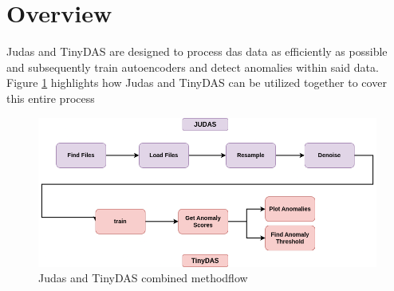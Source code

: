 \section{Overview}

Judas and TinyDAS are designed to process \acrshort{das} data as efficiently as possible and subsequently train autoencoders and detect anomalies within said data. Figure \ref{fig:judasnet_overview} highlights how Judas and TinyDAS can be utilized together to cover this entire process

\begin{figure}[!h]
    \centering
    \includegraphics[scale=.4]{figures/api_overview.png}
    \caption{Judas and TinyDAS combined methodflow}
    \label{fig:judasnet_overview}
\end{figure}
